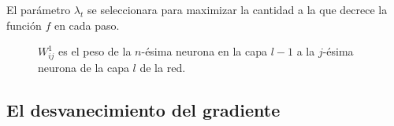 El parámetro $\lambda_{t}$ se seleccionara para maximizar la cantidad a la que decrece la función $f$ en cada paso.


\begin{figure}[H]
	\centering
    \scalebox{0.6}{}
    \caption{$W^{1}_{ij}$ es el peso de la $n$-ésima neurona en la capa $l - 1$ a la $j$-ésima neurona de la capa $l$ de la red.}
\end{figure}

\subsection{El desvanecimiento del gradiente}
